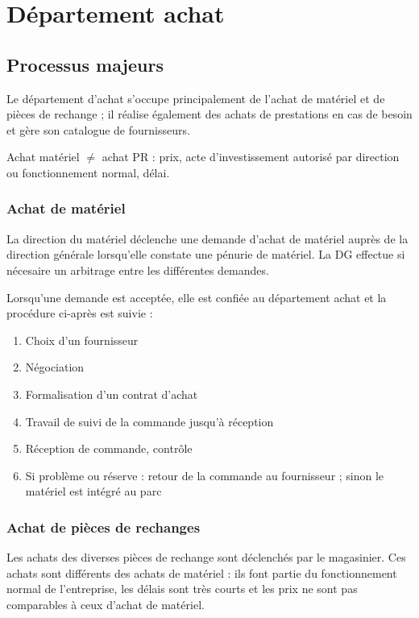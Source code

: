 \section{Département achat}


\subsection{Processus majeurs}

Le département d'achat s'occupe principalement de l'achat de matériel et de
pièces de rechange ; il réalise également des achats de prestations en cas
de besoin et gère son catalogue de fournisseurs.

Achat matériel $\neq$ achat PR : prix, acte d'investissement autorisé
par direction ou fonctionnement normal, délai.


\subsubsection{Achat de matériel}

La direction du matériel déclenche une demande d'achat de matériel auprès
de la direction générale lorsqu'elle constate une pénurie de matériel. La
DG effectue si nécesaire un arbitrage entre les différentes demandes.

Lorsqu'une demande est acceptée, elle est confiée au département achat et
la procédure ci-après est suivie :

\begin{enumerate}
\item Choix d'un fournisseur
\item Négociation
\item Formalisation d'un contrat d'achat
\item Travail de suivi de la commande jusqu'à réception
\item Réception de commande, contrôle
\item Si problème ou réserve : retour de la commande au fournisseur ; sinon
        le matériel est intégré au parc
\end{enumerate}


\subsubsection{Achat de pièces de rechanges}

Les achats des diverses pièces de rechange sont déclenchés
par le magasinier.
Ces achats sont différents des achats de matériel : ils font partie du
fonctionnement normal de l'entreprise, les délais sont très courts et les
prix ne sont pas comparables à ceux d'achat de matériel.

